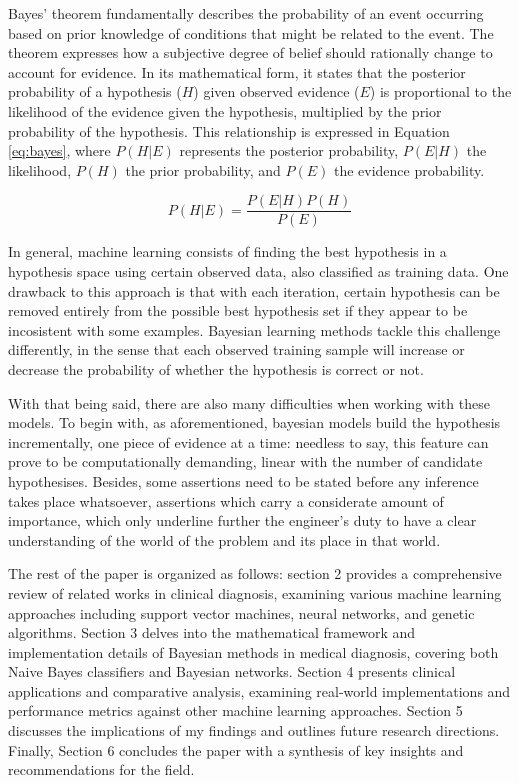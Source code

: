 \documentclass[3p,times,procedia]{elsarticle}
\begin{document}
Bayes' theorem fundamentally describes the probability of an event 
occurring based on prior knowledge of conditions that might be 
related to the event. The theorem expresses how a subjective 
degree of belief should rationally change to account for evidence.
In its mathematical form, it states that the posterior probability
of a hypothesis ($H$) given observed evidence ($E$) is proportional to
the likelihood of the evidence given the hypothesis, multiplied by
the prior probability of the hypothesis. This relationship is 
expressed in Equation \ref{eq:bayes}, where $P(H|E)$ represents the
posterior probability, $P(E|H)$ the likelihood, $P(H)$ the prior
probability, and $P(E)$ the evidence probability. 

\begin{equation}
    P(H|E) = \frac{P(E|H)P(H)}{P(E)}
    \label{eq:bayes}
\end{equation}

In general, machine learning consists of finding the best
hypothesis in a hypothesis space using certain observed data, 
also classified as training data. One drawback to this
approach is that with each iteration, certain hypothesis can
be removed entirely from the possible best hypothesis set if
they appear to be incosistent with some examples. Bayesian 
learning methods tackle this challenge differently, in the 
sense that each observed training sample will increase or
decrease the probability of whether the hypothesis is correct
or not.

With that being said, there are also many difficulties when 
working with these models. To begin with, as aforementioned,
bayesian models build the hypothesis incrementally, one 
piece of evidence at a time: needless to say, this feature
can prove to be computationally demanding, linear with the 
number of candidate hypothesises. Besides, some assertions
need to be 
stated before any inference takes place whatsoever, assertions 
which carry a considerate amount of importance, which only
underline further the engineer's duty to have a clear 
understanding of the world of the problem and its place 
in that world.

The rest of the paper is organized as follows: section 2 provides a comprehensive review of related works in clinical diagnosis, examining various machine learning approaches including support vector machines, neural networks, and genetic algorithms. Section 3 delves into the mathematical framework and implementation details of Bayesian methods in medical diagnosis, covering both Naive Bayes classifiers and Bayesian networks. Section 4 presents clinical applications and comparative analysis, examining real-world implementations and performance metrics against other machine learning approaches. Section 5 discusses the implications of my findings and outlines future research directions. Finally, Section 6 concludes the paper with a synthesis of key insights and recommendations for the field.
\end{document}
